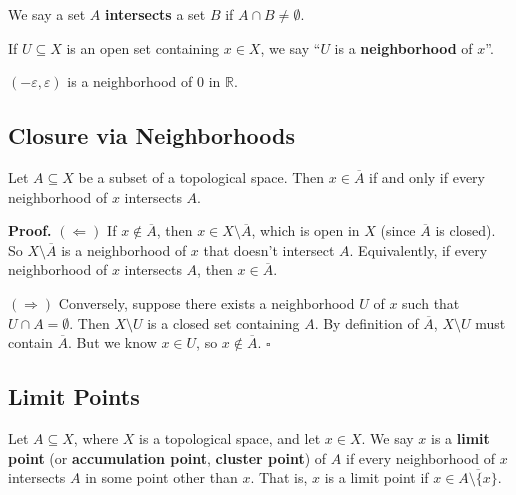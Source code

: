 \documentclass[11pt]{report}
\renewenvironment{proof}[1][Proof]{\noindent\textbf{#1.} }{\hfill$\square$\par\vspace{5pt}}
\begin{document}
\begin{defbox}
We say a set $A$ \textbf{intersects} a set $B$ if $A \cap B \neq \emptyset$.

If $U \subseteq X$ is an open set containing $x \in X$, we say ``$U$ is a \textbf{neighborhood} of $x$''.
\end{defbox}

\begin{exbox}
$(-\varepsilon, \varepsilon)$ is a neighborhood of $0$ in $\mathbb{R}$.
\end{exbox}

\subsection{Closure via Neighborhoods}

\begin{thmbox}
Let $A \subseteq X$ be a subset of a topological space. Then $x \in \overline{A}$ if and only if every neighborhood of $x$ intersects $A$.
\end{thmbox}

\begin{proof}
$(\Leftarrow)$ If $x \notin \overline{A}$, then $x \in X \setminus \overline{A}$, which is open in $X$ (since $\overline{A}$ is closed). So $X \setminus \overline{A}$ is a neighborhood of $x$ that doesn't intersect $A$. Equivalently, if every neighborhood of $x$ intersects $A$, then $x \in \overline{A}$.

$(\Rightarrow)$ Conversely, suppose there exists a neighborhood $U$ of $x$ such that $U \cap A = \emptyset$. Then $X \setminus U$ is a closed set containing $A$. By definition of $\overline{A}$, $X \setminus U$ must contain $\overline{A}$. But we know $x \in U$, so $x \notin \overline{A}$.
\end{proof}

\subsection{Limit Points}

\begin{defbox}
Let $A \subseteq X$, where $X$ is a topological space, and let $x \in X$. We say $x$ is a \textbf{limit point} (or \textbf{accumulation point}, \textbf{cluster point}) of $A$ if every neighborhood of $x$ intersects $A$ in some point other than $x$. That is, $x$ is a limit point if $x \in \overline{A \setminus \{x\}}$.
\end{defbox}
\end{document}
